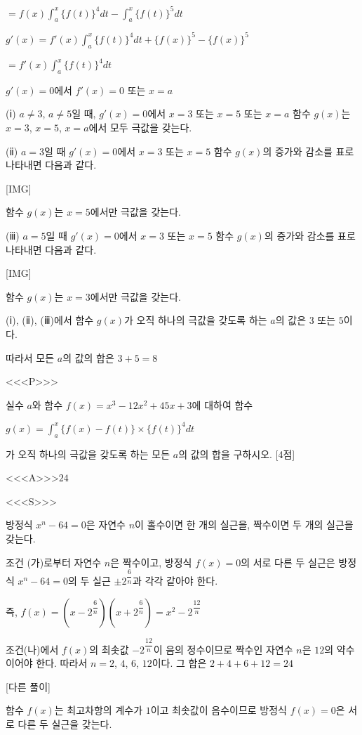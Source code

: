 \documentclass{oblivoir}
\begin{document}
$=f(x)\displaystyle\int_{a}^{x}\{f(t)\}^{4}dt -\displaystyle\int_{a}^{x}\{f(t)\}^{5}dt$

$g'(x)$$=f'(x)\displaystyle\int_{a}^{x}\{f(t)\}^{4}dt +\{f(x)\}^{5}-\{f(x)\}^{5}$

$=f'(x)\displaystyle\int_{a}^{x}\{f(t)\}^{4}dt$

$g'(x)=0$에서 $f'(x)=0$ 또는 $x=a$

(ⅰ) $a\ne 3$, $a\ne 5$일 때, 
$g'(x)=0$에서 $x=3$ 또는 $x=5$ 또는 $x=a$
함수 $g(x)$는 $x=3$, $x=5$, $x=a$에서 모두 극값을 갖는다.

(ⅱ) $a=3$일 때
$g'(x)=0$에서 $x=3$ 또는 $x=5$
함수 $g(x)$의 증가와 감소를 표로 나타내면 다음과 같다.

[IMG]

함수 $g(x)$는 $x=5$에서만 극값을 갖는다.

(ⅲ) $a=5$일 때
$g'(x)=0$에서 $x=3$ 또는 $x=5$
함수 $g(x)$의 증가와 감소를 표로 나타내면 다음과 같다.

[IMG]

함수 $g(x)$는 $x=3$에서만 극값을 갖는다.

(ⅰ), (ⅱ), (ⅲ)에서 함수 $g(x)$가 오직 하나의 극값을 갖도록 하는 $a$의 값은 $3$ 또는 $5$이다.

따라서 모든 $a$의 값의 합은 $3+5=8$

<<<P>>>

실수 $a$와 함수 $f(x)=x^{3}-12x^{2}+45x+3$에 대하여 함수

$g(x)=\displaystyle\int_{a}^{x}\{f(x)-f(t)\}\times\{f(t)\}^{4}dt$

가 오직 하나의 극값을 갖도록 하는 모든 $a$의 값의 합을 구하시오. [4점]

<<<A>>>$24$

<<<S>>>

방정식 $x^{n}-64=0$은 자연수 $n$이 홀수이면 한 개의 실근을, 짝수이면 두 개의 실근을 갖는다.

조건 (가)로부터 자연수 $n$은 짝수이고, 방정식 $f(x)=0$의 서로 다른 두 실근은 방정식 $x^{n}-64=0$의 두 실근 $\pm 2^{\dfrac{6}{n}}$과 각각 같아야 한다.

즉, $f(x)=\left(x-2^{\dfrac{6}{n}}\right)\left(x+2^{\dfrac{6}{n}}\right)=x^{2}-2^{\dfrac{12}{n}}$

조건(나)에서 $f(x)$의 최솟값 $-2^{\dfrac{12}{n}}$이 음의 정수이므로 짝수인 자연수 $n$은 $12$의 약수이어야 한다. 따라서 $n=2$, $4$, $6$, $12$이다. 그 합은 $2+4+6+12 = 24$

[다른 풀이]

함수 $f(x)$는 최고차항의 계수가 $1$이고 최솟값이 음수이므로 방정식 $f(x)=0$은 서로 다른 두 실근을 갖는다.
\end{document}
